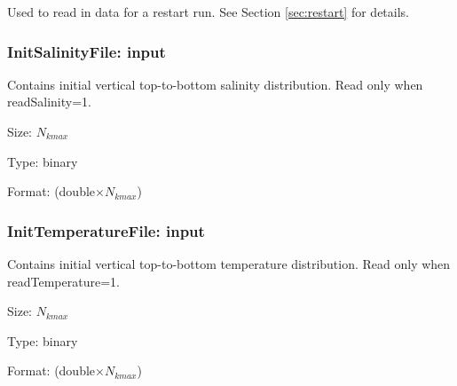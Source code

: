 \documentclass[12pt,oneside]{article}
\begin{document}
Used to read in data for a restart run.  See Section \ref{sec:restart} for details.


\subsubsection{InitSalinityFile: input}

Contains initial vertical top-to-bottom salinity distribution.  Read only when readSalinity=1.
\begin{list}{}
\item Size: $N_{kmax}$
\item Type: binary
\item Format: (double$\times N_{kmax}$)
\end{list}


\subsubsection{InitTemperatureFile: input}

Contains initial vertical top-to-bottom temperature distribution.  Read only when \\readTemperature=1.
\begin{list}{}
\item Size: $N_{kmax}$
\item Type: binary
\item Format: (double$\times N_{kmax}$)
\end{list}



\end{document}
